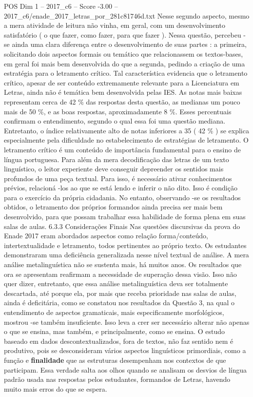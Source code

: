 \begin{textsample}{POS Dim 1 – 2017\_c6 – Score -3.00 – 2017\_c6/enade\_2017\_letras\_por\_281c81746d.txt}
Nesse segundo aspecto, mesmo a mera atividade de leitura não vinha, em geral, com um desenvolvimento satisfatório ( o que fazer, como fazer, para que fazer ).
Nessa questão, percebeu -se ainda uma clara diferença entre o desenvolvimento de suas partes : a primeira, solicitando dois aspectos formais ou temático que relacionassem os textos-bases, em geral foi mais bem desenvolvida do que a segunda, pedindo a criação de uma estratégia para o letramento crítico.
Tal característica evidencia que o letramento crítico, apesar de ser conteúdo extremamente relevante para a Licenciatura em Letras, ainda não é temática bem desenvolvida pelas IES.
As notas mais baixas representam cerca de 42 \% das respostas desta questão, as medianas um pouco mais de 50 \%, e as boas respostas, aproximadamente 8 \%.
Esses percentuais confirmam o entendimento, segundo o qual essa foi uma questão mediana.
Entretanto, o índice relativamente alto de notas inferiores a 35 ( 42 \% ) se explica especialmente pela dificuldade no estabelecimento de estratégias de letramento.
O letramento crítico é um conteúdo de importância fundamental para o ensino de língua portuguesa.
Para além da mera decodificação das letras de um texto linguístico, o leitor experiente deve conseguir depreender os sentidos mais profundos de uma peça textual.
Para isso, é necessário ativar conhecimentos prévios, relacioná -los ao que se está lendo e inferir o não dito.
Isso é condição para o exercício da própria cidadania.
No entanto, observando -se os resultados obtidos, o letramento dos próprios formandos ainda precisa ser mais bem desenvolvido, para que possam trabalhar essa habilidade de forma plena em suas salas de aulas. 6.3.3 Considerações Finais Nas questões discursivas da prova do Enade 2017 eram abordados aspectos como relação forma/conteúdo, intertextualidade e letramento, todos pertinentes ao próprio texto.
Os estudantes demonstraram uma deficiência generalizada nesse nível textual de análise.
A mera análise metalinguística não se sustenta mais, há muitos anos.
Os resultados que ora se apresentam reafirmam a necessidade de superação dessa visão.
Isso não quer dizer, entretanto, que essa análise metalinguística deva ser totalmente descartada, até porque ela, por mais que receba prioridade nas salas de aulas, ainda é deficitária, como se constatou nos resultados da Questão 3, na qual o entendimento de aspectos gramaticais, mais especificamente morfológicos, mostrou -se também insuficiente.
Isso leva a crer ser necessário alterar não apenas o que se ensina, mas também, e principalmente, como se ensina.
O estudo baseado em dados descontextualizados, fora de textos, não faz sentido nem é produtivo, pois se desconsideram vários aspectos linguísticos primordiais, como a função e \textbf{finalidade} que as estruturas desempenham nos contextos de que participam.
Essa verdade salta aos olhos quando se analisam os desvios de língua padrão usada nas respostas pelos estudantes, formandos de Letras, havendo muito mais erros do que se espera.

\end{textsample}
